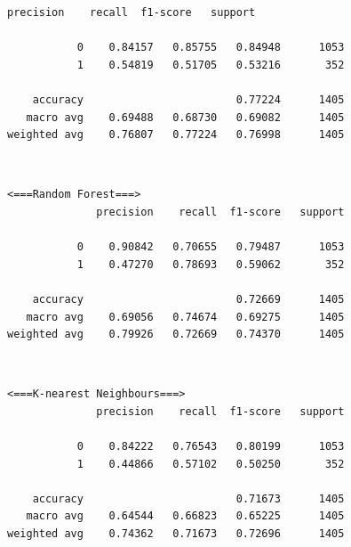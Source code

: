 \documentclass[11pt]{article}
\begin{document}
    \begin{Verbatim}[commandchars=\\\{\}]
              precision    recall  f1-score   support

           0    0.84157   0.85755   0.84948      1053
           1    0.54819   0.51705   0.53216       352

    accuracy                        0.77224      1405
   macro avg    0.69488   0.68730   0.69082      1405
weighted avg    0.76807   0.77224   0.76998      1405

    \end{Verbatim}

    \begin{center}
    \end{center}
    { \hspace*{\fill} \\}
    
    \begin{Verbatim}[commandchars=\\\{\}]
 <===Random Forest===>
              precision    recall  f1-score   support

           0    0.90842   0.70655   0.79487      1053
           1    0.47270   0.78693   0.59062       352

    accuracy                        0.72669      1405
   macro avg    0.69056   0.74674   0.69275      1405
weighted avg    0.79926   0.72669   0.74370      1405

    \end{Verbatim}

    \begin{center}
    \end{center}
    { \hspace*{\fill} \\}
    
    \begin{Verbatim}[commandchars=\\\{\}]
 <===K-nearest Neighbours===>
              precision    recall  f1-score   support

           0    0.84222   0.76543   0.80199      1053
           1    0.44866   0.57102   0.50250       352

    accuracy                        0.71673      1405
   macro avg    0.64544   0.66823   0.65225      1405
weighted avg    0.74362   0.71673   0.72696      1405

    \end{Verbatim}
\end{document}
